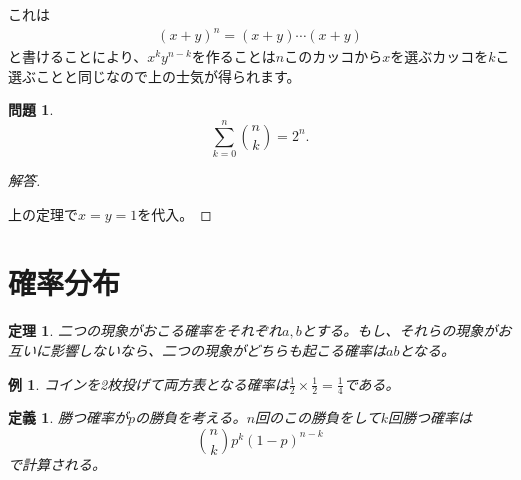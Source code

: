 \documentclass{ltjsarticle}
\newtheorem{theorem}{定理}[section]
\newtheorem{definition}{定義}[section]
\newtheorem{problem}{問題}
\newtheorem{example}{例}[section]
\begin{document}
これは
\begin{align*}
(x+y)^n=(x+y)\cdots(x+y)
\end{align*}
と書けることにより、$x^ky^{n-k}$を作ることは$n$このカッコから$x$を選ぶカッコを$k$こ選ぶことと同じなので上の士気が得られます。

\begin{problem}
\begin{equation*}
\sum_{k=0}^n {n\choose k} = 2^n.
\end{equation*}
\end{problem}
\begin{proof}[解答]$\:$
\par 上の定理で$x=y=1$を代入。
\end{proof}

\section{確率分布}

\begin{theorem}
二つの現象がおこる確率をそれぞれ$a,b$とする。もし、それらの現象がお互いに影響しないなら、二つの現象がどちらも起こる確率は$ab$となる。
\end{theorem}

\begin{example}
コインを2枚投げて両方表となる確率は${\frac 1 2}\times{\frac 1 2} = {\frac 1 4}$である。
\end{example}

\begin{definition}
勝つ確率が$p$の勝負を考える。$n$回のこの勝負をして$k$回勝つ確率は
\begin{equation*}
{n\choose k}p^k(1-p)^{n-k}
\end{equation*}
で計算される。
\end{definition}
\end{document}
